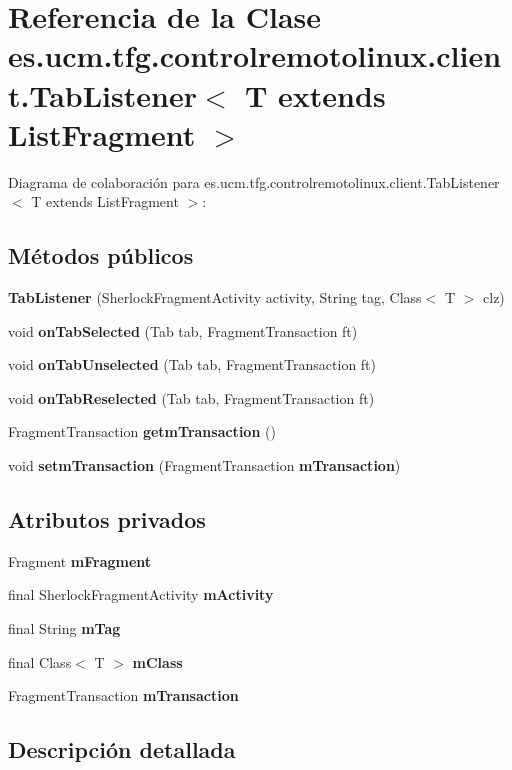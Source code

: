 \section{Referencia de la Clase es.\-ucm.\-tfg.\-controlremotolinux.\-client.\-Tab\-Listener$<$ T extends List\-Fragment $>$}
\label{classes_1_1ucm_1_1tfg_1_1controlremotolinux_1_1client_1_1TabListener_3_01T_01extends_01ListFragment_01_4}


Diagrama de colaboración para es.\-ucm.\-tfg.\-controlremotolinux.\-client.\-Tab\-Listener$<$ T extends List\-Fragment $>$\-:
\subsection*{Métodos públicos}
\begin{DoxyCompactItemize}
\item 
{\bf Tab\-Listener} (Sherlock\-Fragment\-Activity activity, String tag, Class$<$ T $>$ clz)
\item 
void {\bf on\-Tab\-Selected} (Tab tab, Fragment\-Transaction ft)
\item 
void {\bf on\-Tab\-Unselected} (Tab tab, Fragment\-Transaction ft)
\item 
void {\bf on\-Tab\-Reselected} (Tab tab, Fragment\-Transaction ft)
\item 
Fragment\-Transaction {\bf getm\-Transaction} ()
\item 
void {\bf setm\-Transaction} (Fragment\-Transaction {\bf m\-Transaction})
\end{DoxyCompactItemize}
\subsection*{Atributos privados}
\begin{DoxyCompactItemize}
\item 
Fragment {\bf m\-Fragment}
\item 
final Sherlock\-Fragment\-Activity {\bf m\-Activity}
\item 
final String {\bf m\-Tag}
\item 
final Class$<$ T $>$ {\bf m\-Class}
\item 
Fragment\-Transaction {\bf m\-Transaction}
\end{DoxyCompactItemize}


\subsection{Descripción detallada}


